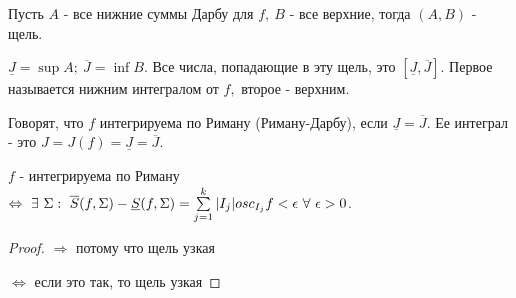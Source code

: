 \documentclass[12pt]{report}
\begin{document}
\begin{cor}
Пусть $A$ - все нижние суммы Дарбу для $f, ~B$ - все верхние, тогда $(A, B)$ - щель.

$\underline{J} = \sup{A}; ~\overline{J} = \inf{B}$. Все числа, попадающие в эту щель, это $[\underline{J}, \overline{J}]$. Первое называется нижним интегралом от $f,$ второе - верхним.
\end{cor}

\begin{defn}
Говорят, что $f$ интегрируема по Риману (Риману-Дарбу), если $\underline{J} = \overline{J}$. Ее интеграл  - это $J = J(f) = \underline{J} = \overline{J}$.
\end{defn}

\begin{st}
$f$ - интегрируема по Риману $\Leftrightarrow ~\exists ~\Sigma: ~\overline{S}(f, \Sigma) - \underline{S}(f, \Sigma) = \sum\limits_{j = 1}^k{|I_j|osc_{I_j}{f}} < \epsilon ~\forall ~\epsilon > 0$.
\end{st}
\begin{proof}
$\Rightarrow$ потому что щель узкая

$\Leftrightarrow$ если это так, то щель узкая
\end{proof}
\end{document}

